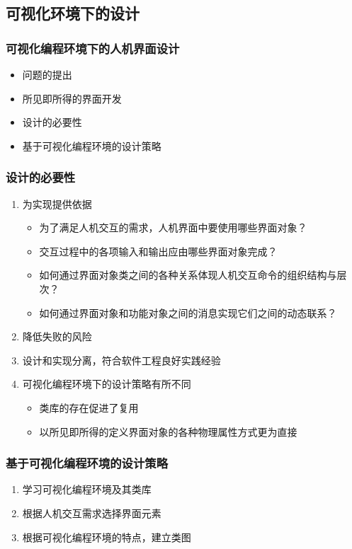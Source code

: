 \documentclass[compress]{beamer}
\begin{document}
\subsection{可视化环境下的设计}

\begin{frame}
\frametitle{可视化编程环境下的人机界面设计}
\begin{itemize}
\item 问题的提出
\item 所见即所得的界面开发
\item 设计的必要性
\item 基于可视化编程环境的设计策略
\end{itemize}
\end{frame}

\begin{frame}
\frametitle{设计的必要性}

 {
\begin{enumerate}
  \item 为实现提供依据
\begin{itemize}
\item 为了满足人机交互的需求，人机界面中要使用哪些界面对象？
\item 交互过程中的各项输入和输出应由哪些界面对象完成？

\item 如何通过界面对象类之间的各种关系体现人机交互命令的组织结构与层次？
\item 如何通过界面对象和功能对象之间的消息实现它们之间的动态联系？
\end{itemize}
\end{enumerate}
}

 {
  \begin{enumerate}
      \setcounter{enumi}{1}
    \item 降低失败的风险
    \item 设计和实现分离，符合软件工程良好实践经验
    \item 可视化编程环境下的设计策略有所不同
      \begin{itemize}
        \item 类库的存在促进了复用
        \item 以所见即所得的定义界面对象的各种物理属性方式更为直接
      \end{itemize}
  \end{enumerate}
}

\end{frame}


\begin{frame}
\frametitle{基于可视化编程环境的设计策略}
\begin{enumerate}
  \item 学习可视化编程环境及其类库
  \item 根据人机交互需求选择界面元素
  \item 根据可视化编程环境的特点，建立类图
\end{enumerate}
\end{frame}
\end{document}
